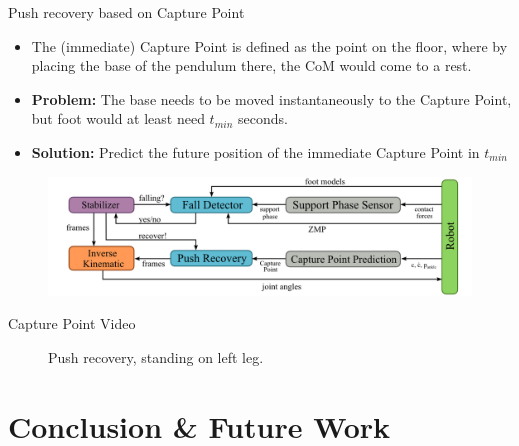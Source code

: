 \begin{frame}{Push recovery based on Capture Point}

\begin{itemize}
\item
  The (immediate) Capture Point is defined as the point on the floor,
  where by placing the base of the pendulum there, the CoM would come to
  a rest. \cite{koolen2012capturability}
\item
  \textbf{Problem:} The base needs to be moved instantaneously to the
  Capture Point, but foot would at least need \(t_{min}\) seconds.
\item
  \textbf{Solution:} Predict the future position of the immediate
  Capture Point in \(t_{min}\)
\end{itemize}

\begin{figure}
  \begin{center}
     \includegraphics[width=\textwidth]{images/recovery_architechture.png}
  \end{center}
\end{figure}

\end{frame}

\begin{frame}{Capture Point Video}

\begin{figure}
  \begin{center}
  \end{center}
  \caption{Push recovery, standing on left leg.}
\end{figure}

\end{frame}

\section{Conclusion \& Future Work}\label{conclusion-future-work}

